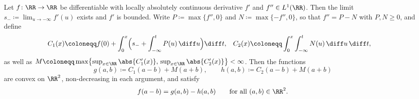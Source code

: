 \begin{theoremenv}\label{thm:smooth_dc_split}
Let $f\colon \RR \to \RR$ be differentiable with locally absolutely continuous derivative $f'$ and $f'' \in L^1(\RR)$. Then the limit $s_- \coloneqq \lim_{u\to-\infty} f'(u)$ exists and $f'$ is bounded. Write $P \coloneqq \max\{f'',0\}$ and $N \coloneqq \max\{-f'',0\}$, so that $f'' = P - N$ with $P, N \ge 0$, and define
\begin{align}
	C_1(x) &\coloneqq f(0) + \int_0^x \Bigl( s_- + \int_{-\infty}^t P(u)\,\diff u \Bigr) \diff t,
	&
	C_2(x) &\coloneqq \int_0^x \int_{-\infty}^t N(u)\,\diff u \,\diff t,
	\label{eq:curvature_antiderivatives}
\end{align}
as well as $M \coloneqq \max\bigl\{ \sup_{x\in\RR} \abs{C_1'(x)},\, \sup_{x\in\RR} \abs{C_2'(x)} \bigr\} < \infty$. Then the functions
\begin{equation}
	g(a,b) \coloneqq C_1(a-b) + M(a+b),
	\qquad
	h(a,b) \coloneqq C_2(a-b) + M(a+b)
	\label{eq:smooth_split_pair}
\end{equation}
are convex on $\RR^2$, non-decreasing in each argument, and satisfy
\begin{equation}
	f(a-b) = g(a,b) - h(a,b) \qquad \text{for all } (a,b) \in \RR^2.
	\label{eq:smooth_splitting_identity}
\end{equation}
\end{theoremenv}


